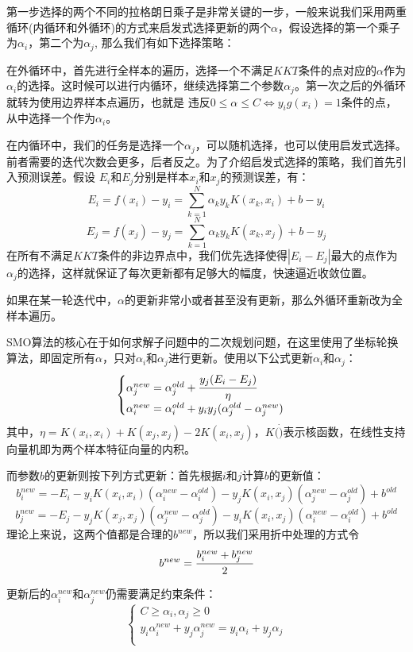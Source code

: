 \documentclass{article}
\begin{document}
第一步选择的两个不同的拉格朗日乘子是非常关键的一步，一般来说我们采用两重循环(内循环和外循环)的方式来启发式选择更新的两个$\alpha$，假设选择的第一个乘子为$\alpha_i$，第二个为$\alpha_j$,
那么我们有如下选择策略：

在外循环中，首先进行全样本的遍历，选择一个不满足$KKT$条件的点对应的$\alpha$作为$\alpha_i$的选择。这时候可以进行内循环，继续选择第二个参数$\alpha_j$。第一次之后的外循环就转为使用边界样本点遍历，也就是
违反$0\leq\alpha\leq C\Leftrightarrow y_ig(x_i)=1$条件的点，从中选择一个作为$\alpha_i$。

在内循环中，我们的任务是选择一个$\alpha_j$，可以随机选择，也可以使用启发式选择。前者需要的迭代次数会更多，后者反之。为了介绍启发式选择的策略，我们首先引入预测误差。假设
$E_i$和$E_j$分别是样本$x_i$和$x_j$的预测误差，有：
$$E_i=f(x_i)-y_i=\sum_{k=1}^{N}\alpha_ky_kK(x_k,x_i)+b-y_i$$
$$E_j=f(x_j)-y_j=\sum_{k=1}^{N}\alpha_ky_kK(x_k,x_j)+b-y_j$$
在所有不满足$KKT$条件的非边界点中，我们优先选择使得$|E_i-E_j|$最大的点作为$\alpha_j$的选择，这样就保证了每次更新都有足够大的幅度，快速逼近收敛位置。

如果在某一轮迭代中，$\alpha$的更新非常小或者甚至没有更新，那么外循环重新改为全样本遍历。

SMO算法的核心在于如何求解子问题中的二次规划问题，在这里使用了坐标轮换算法，即固定所有$\alpha$，只对$\alpha_i$和$\alpha_j$进行更新。使用以下公式更新$\alpha_i$和$\alpha_j$：
$$\begin{cases}
\alpha_j^{new}=\alpha_j^{old}+\cfrac{y_j(E_i-E_j)}{\eta}\\
\alpha_i^{new}=\alpha_i^{old}+y_iy_j(\alpha_j^{old}-\alpha_j^{new}) \\
\end{cases}$$
其中，$\eta=K(x_i,x_i)+K(x_j,x_j)-2K(x_i,x_j)$，$K(\dot)$表示核函数，在线性支持向量机即为两个样本特征向量的内积。

而参数$b$的更新则按下列方式更新：首先根据$i$和$j$计算$b$的更新值：
$$b_i^{new}=-E_i-y_iK(x_i,x_i)(\alpha_i^{new}-\alpha_i^{old})-y_jK(x_i,x_j)(\alpha_j^{new}-\alpha_j^{old})+b^{old}$$
$$b_j^{new}=-E_j-y_jK(x_j,x_j)(\alpha_j^{new}-\alpha_j^{old})-y_iK(x_i,x_j)(\alpha_i^{new}-\alpha_i^{old})+b^{old}$$
理论上来说，这两个值都是合理的$b^{new}$，所以我们采用折中处理的方式令
$$b^{new}=\cfrac{b_i^{new}+b_j^{new}}{2}$$

更新后的$\alpha_i^{new}$和$\alpha_j^{new}$仍需要满足约束条件：
$$\begin{cases}
C\geq\alpha_i,\alpha_j\geq 0 \\
y_i\alpha_i^{new}+y_j\alpha_j^{new}=y_i\alpha_i+y_j\alpha_j \\
\end{cases}$$
\end{document}
